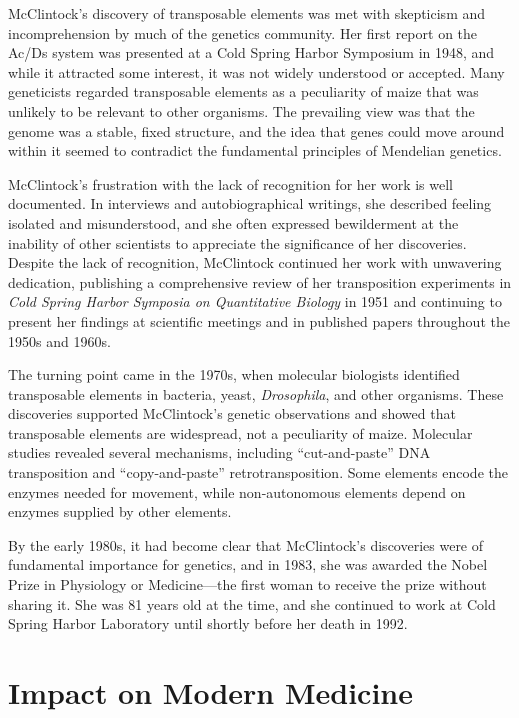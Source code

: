 McClintock's discovery of transposable elements was met with skepticism and incomprehension by much of the genetics community. Her first report on the Ac/Ds system was presented at a Cold Spring Harbor Symposium in 1948, and while it attracted some interest, it was not widely understood or accepted. Many geneticists regarded transposable elements as a peculiarity of maize that was unlikely to be relevant to other organisms. The prevailing view was that the genome was a stable, fixed structure, and the idea that genes could move around within it seemed to contradict the fundamental principles of Mendelian genetics.

McClintock's frustration with the lack of recognition for her work is well documented. In interviews and autobiographical writings, she described feeling isolated and misunderstood, and she often expressed bewilderment at the inability of other scientists to appreciate the significance of her discoveries. Despite the lack of recognition, McClintock continued her work with unwavering dedication, publishing a comprehensive review of her transposition experiments in \emph{Cold Spring Harbor Symposia on Quantitative Biology} in 1951 and continuing to present her findings at scientific meetings and in published papers throughout the 1950s and 1960s.

The turning point came in the 1970s, when molecular biologists identified transposable elements in bacteria, yeast, \emph{Drosophila}, and other organisms. These discoveries supported McClintock's genetic observations and showed that transposable elements are widespread, not a peculiarity of maize. Molecular studies revealed several mechanisms, including ``cut-and-paste'' DNA transposition and ``copy-and-paste'' retrotransposition. Some elements encode the enzymes needed for movement, while non-autonomous elements depend on enzymes supplied by other elements.

By the early 1980s, it had become clear that McClintock's discoveries were of fundamental importance for genetics, and in 1983, she was awarded the Nobel Prize in Physiology or Medicine---the first woman to receive the prize without sharing it. She was 81 years old at the time, and she continued to work at Cold Spring Harbor Laboratory until shortly before her death in 1992.

\section{Impact on Modern Medicine}

